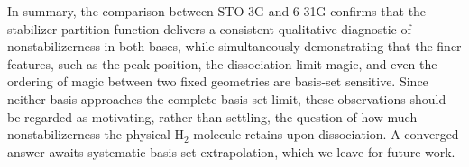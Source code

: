 \documentclass[aps,pra,superscriptaddress,twocolumn,longbibliography]{revtex4-2}
\begin{document}
In summary, the comparison between STO-3G and 6-31G confirms that the stabilizer partition function delivers a consistent qualitative diagnostic of nonstabilizerness in both bases, while simultaneously demonstrating that the finer features, such as the peak position, the dissociation-limit magic, and even the ordering of magic between two fixed geometries are basis-set sensitive. Since neither basis approaches the complete-basis-set limit, these observations should be regarded as motivating, rather than settling, the question of how much nonstabilizerness the physical $\mathrm{H}_2$ molecule retains upon dissociation. A converged answer awaits systematic basis-set extrapolation, which we leave for future work.
\end{document}
